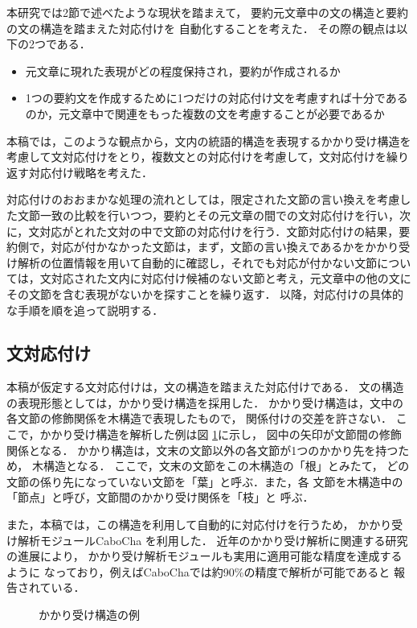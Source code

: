 本研究では2節で述べたような現状を踏まえて，
要約元文章中の文の構造と要約の文の構造を踏まえた対応付けを
自動化することを考えた．
その際の観点は以下の2つである．
\begin{itemize}
\item 元文章に現れた表現がどの程度保持され，要約が作成されるか
\item 1つの要約文を作成するために1つだけの対応付け文を考慮すれば十分であるのか，元文章中で関連をもった複数の文を考慮することが必要であるか
\end{itemize}

本稿では，このような観点から，文内の統語的構造を表現するかかり受け構造を
考慮して文対応付けをとり，複数文との対応付けを考慮して，文対応付けを繰り返す対応付け戦略を考えた．

対応付けのおおまかな処理の流れとしては，限定された文節の言い換えを考慮した文節一致の比較を行いつつ，要約とその元文章の間での文対応付けを行い，次に，文対応がとれた文対の中で文節の対応付けを行う．文節対応付けの結果，要約側で，対応が付かなかった文節は，まず，文節の言い換えであるかをかかり受け解析の位置情報を用いて自動的に確認し，それでも対応が付かない文節については，文対応された文内に対応付け候補のない文節と考え，元文章中の他の文にその文節を含む表現がないかを探すことを繰り返す．
以降，対応付けの具体的な手順を順を追って説明する．

\subsection{文対応付け}

本稿が仮定する文対応付けは，文の構造を踏まえた対応付けである．
文の構造の表現形態としては，かかり受け構造を採用した．
かかり受け構造は，文中の各文節の修飾関係を木構造で表現したもので，
関係付けの交差を許さない．
ここで，かかり受け構造を解析した例は図 \ref{depstruc}に示し，
図中の矢印が文節間の修飾関係となる．
かかり構造は，文末の文節以外の各文節が1つのかかり先を持つため，
木構造となる．
ここで，文末の文節をこの木構造の「根」とみたて，
どの文節の係り先になっていない文節を「葉」と呼ぶ．また，各
文節を木構造中の「節点」と呼び，文節間のかかり受け関係を「枝」と
呼ぶ．

また，本稿では，この構造を利用して自動的に対応付けを行うため，
かかり受け解析モジュールCaboCha \cite{kudo01}を利用した．
近年のかかり受け解析に関連する研究の進展により，
かかり受け解析モジュールも実用に適用可能な精度を達成するように
なっており，例えばCaboChaでは約90\%の精度で解析が可能であると
報告されている．

\begin{figure}[htbp]
\begin{center}
\caption{かかり受け構造の例}
\label{depstruc}
\end{center}
\end{figure}

